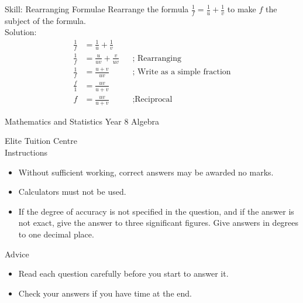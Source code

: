\begin{bxTip}[colbacktitle=green]{Skill: Rearranging Formulae}
    Rearrange the formula $\frac{1}{f}=\frac{1}{u}+\frac{1}{v} $ to make $f$ the subject of the formula. \\
    
    Solution:    
    \begin{align*}
        \frac{1}{f}&=\frac{1}{u}+\frac{1}{v}         && \text{ }                              \\[10pt]
        \frac{1}{f}&=\frac{u}{uv}+\frac{v}{uv}       && \text{; Rearranging}                   \\[10pt]
        \frac{1}{f}&=\frac{u+v}{uv}                  && \text{; Write as a simple fraction}    \\[10pt]
        \frac{f}{1}&=\frac{uv}{u+v}                  && \text{ }                            \\[10pt]
        f&=\frac{uv}{u+v}                            && \text{;Reciprocal}  
\end{align*}        
\end{bxTip}

\clearpage
\setcounter{page}{1}

\begin{bxExamHeader}
    
    \begin{center}\huge{Mathematics and Statistics Year 8 Algebra} \end{center}
	\null\hfill Elite Tuition Centre \\
    Instructions 
    \begin{itemize}
        \item Without sufficient working, correct answers may be awarded no marks.
		\item Calculators must not be used.
        \item If the degree of accuracy is not specified in the question, and if the answer is not exact, give the answer to
three significant figures. Give answers in degrees to one decimal place.
    \end{itemize}
	
    \vspace*{\baselineskip}
	
	Advice
	\begin{itemize}
	    \item Read each question carefully before you start to answer it.
        \item Check your answers if you have time at the end.
	\end{itemize}
\end{bxExamHeader}


